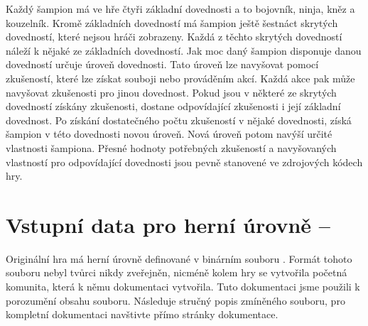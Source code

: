 Každý šampion má ve hře čtyři základní dovednosti a to bojovník, ninja, kněz a kouzelník.
Kromě základních dovedností má šampion ještě šestnáct skrytých dovedností, které nejsou hráči zobrazeny.
Každá z těchto skrytých dovedností náleží k nějaké ze základních dovedností.
Jak moc daný šampion disponuje danou dovedností určuje úroveň dovednosti. 
Tato úroveň lze navyšovat pomocí zkušeností, které lze získat souboji nebo prováděním akcí. Každá
akce pak může navyšovat zkušenosti pro jinou dovednost. Pokud jsou v některé ze skrytých dovedností 
získány zkušenosti, dostane odpovídající zkušenosti i její základní dovednost. Po získání dostatečného
počtu zkušeností v nějaké dovednosti, získá šampion v této dovednosti novou úroveň. Nová úroveň potom
navýší určité vlastnosti šampiona. Přesné hodnoty potřebných zkušeností a navyšovaných vlastností pro 
odpovídající dovednosti jsou pevně stanovené ve zdrojových kódech hry.

\section{Vstupní data pro herní úrovně -- }\label{dungeon-objects}

Originální hra má herní úrovně definované v binárním souboru . Formát tohoto souboru nebyl tvůrci nikdy zveřejněn,
nicméně kolem hry se vytvořila početná komunita, která k němu dokumentaci \cite{TechnicalDocumentationFontanel05} vytvořila.
Tuto dokumentaci jsme použili k porozumění obsahu souboru. Následuje stručný popis zmíněného souboru, pro 
kompletní dokumentaci navštivte přímo stránky dokumentace.

